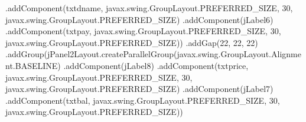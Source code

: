 \documentclass[
  10pt,
]{article}
\newenvironment{Shaded}{}{}
\newcommand{\DecValTok}[1]{\textcolor[rgb]{0.25,0.63,0.44}{#1}}
\newcommand{\FunctionTok}[1]{\textcolor[rgb]{0.02,0.16,0.49}{#1}}
\newcommand{\NormalTok}[1]{#1}
\newcommand{\OperatorTok}[1]{\textcolor[rgb]{0.40,0.40,0.40}{#1}}
\begin{document}
\begin{Shaded}
\begin{Highlighting}[numbers=left,,]
                    \OperatorTok{.}\FunctionTok{addComponent}\OperatorTok{(}\NormalTok{txtdname}\OperatorTok{,}\NormalTok{ javax}\OperatorTok{.}\FunctionTok{swing}\OperatorTok{.}\FunctionTok{GroupLayout}\OperatorTok{.}\FunctionTok{PREFERRED\_SIZE}\OperatorTok{,} \DecValTok{30}\OperatorTok{,}\NormalTok{ javax}\OperatorTok{.}\FunctionTok{swing}\OperatorTok{.}\FunctionTok{GroupLayout}\OperatorTok{.}\FunctionTok{PREFERRED\_SIZE}\OperatorTok{)}
                    \OperatorTok{.}\FunctionTok{addComponent}\OperatorTok{(}\NormalTok{jLabel6}\OperatorTok{)}
                    \OperatorTok{.}\FunctionTok{addComponent}\OperatorTok{(}\NormalTok{txtpay}\OperatorTok{,}\NormalTok{ javax}\OperatorTok{.}\FunctionTok{swing}\OperatorTok{.}\FunctionTok{GroupLayout}\OperatorTok{.}\FunctionTok{PREFERRED\_SIZE}\OperatorTok{,} \DecValTok{30}\OperatorTok{,}\NormalTok{ javax}\OperatorTok{.}\FunctionTok{swing}\OperatorTok{.}\FunctionTok{GroupLayout}\OperatorTok{.}\FunctionTok{PREFERRED\_SIZE}\OperatorTok{))}
                \OperatorTok{.}\FunctionTok{addGap}\OperatorTok{(}\DecValTok{22}\OperatorTok{,} \DecValTok{22}\OperatorTok{,} \DecValTok{22}\OperatorTok{)}
                \OperatorTok{.}\FunctionTok{addGroup}\OperatorTok{(}\NormalTok{jPanel2Layout}\OperatorTok{.}\FunctionTok{createParallelGroup}\OperatorTok{(}\NormalTok{javax}\OperatorTok{.}\FunctionTok{swing}\OperatorTok{.}\FunctionTok{GroupLayout}\OperatorTok{.}\FunctionTok{Alignment}\OperatorTok{.}\FunctionTok{BASELINE}\OperatorTok{)}
                    \OperatorTok{.}\FunctionTok{addComponent}\OperatorTok{(}\NormalTok{jLabel8}\OperatorTok{)}
                    \OperatorTok{.}\FunctionTok{addComponent}\OperatorTok{(}\NormalTok{txtprice}\OperatorTok{,}\NormalTok{ javax}\OperatorTok{.}\FunctionTok{swing}\OperatorTok{.}\FunctionTok{GroupLayout}\OperatorTok{.}\FunctionTok{PREFERRED\_SIZE}\OperatorTok{,} \DecValTok{30}\OperatorTok{,}\NormalTok{ javax}\OperatorTok{.}\FunctionTok{swing}\OperatorTok{.}\FunctionTok{GroupLayout}\OperatorTok{.}\FunctionTok{PREFERRED\_SIZE}\OperatorTok{)}
                    \OperatorTok{.}\FunctionTok{addComponent}\OperatorTok{(}\NormalTok{jLabel7}\OperatorTok{)}
                    \OperatorTok{.}\FunctionTok{addComponent}\OperatorTok{(}\NormalTok{txtbal}\OperatorTok{,}\NormalTok{ javax}\OperatorTok{.}\FunctionTok{swing}\OperatorTok{.}\FunctionTok{GroupLayout}\OperatorTok{.}\FunctionTok{PREFERRED\_SIZE}\OperatorTok{,} \DecValTok{30}\OperatorTok{,}\NormalTok{ javax}\OperatorTok{.}\FunctionTok{swing}\OperatorTok{.}\FunctionTok{GroupLayout}\OperatorTok{.}\FunctionTok{PREFERRED\_SIZE}\OperatorTok{))}

\end{Highlighting}
\end{Shaded}
\end{document}
